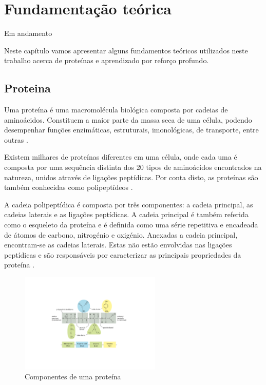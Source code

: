 

\chapter{Fundamentação teórica}
{\color{red} Em andamento}

Neste capítulo vamos apresentar alguns fundamentos teóricos utilizados neste trabalho acerca de proteínas e aprendizado por reforço profundo. 


\section{Proteina}
Uma proteína é uma macromolécula biológica composta por cadeias de aminoácidos. Constituem a maior parte da massa seca de uma célula, podendo desempenhar funções enzimáticas, estruturais, imonológicas, de transporte, entre outras \cite{Bio}. 

Existem milhares de proteínas diferentes em uma célula, onde cada uma é composta por uma sequência distinta dos 20 tipos de aminoácidos encontrados na natureza, unidos através de ligações peptídicas. Por conta disto, as proteínas são também conhecidas como polipeptídeos \cite{Bio}. 

A cadeia polipeptídica é composta por três componentes: a cadeia principal, as cadeias laterais e as ligações peptídicas. A cadeia principal é também referida como o esqueleto da proteína e é definida como uma série repetitiva e encadeada de átomos de carbono, nitrogénio e oxigénio. Anexadas a cadeia principal, encontram-se as cadeias laterais. Estas não estão envolvidas nas ligações peptídicas e são responsáveis por caracterizar as principais propriedades da proteína \cite{Bio}. 


\begin{figure}[H]
     \centering
     \includegraphics[width=0.6\textwidth]{figuras/ProteinBackbone.pdf}
     \caption{Componentes de uma proteína \cite{Bio}}
\end{figure}


